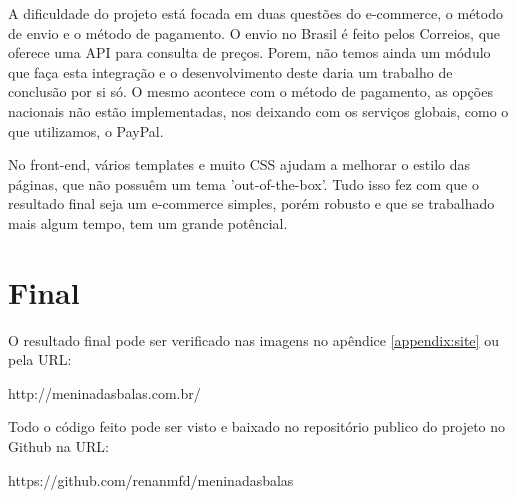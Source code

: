 A dificuldade do projeto está focada em duas questões do e-commerce, o método de envio e o método de pagamento. O envio no Brasil é feito pelos Correios, que oferece uma API para consulta de preços. Porem, não temos ainda um módulo que faça esta integração e o desenvolvimento deste daria um trabalho de conclusão por si só. O mesmo acontece com o método de pagamento, as opções nacionais não estão implementadas, nos deixando com os serviços globais, como o que utilizamos, o PayPal.

No front-end, vários templates e muito CSS ajudam a melhorar o estilo das páginas, que não possuêm um tema 'out-of-the-box'. Tudo isso fez com que o resultado final seja um e-commerce simples, porém robusto e que se trabalhado mais algum tempo, tem um grande potêncial.

\section{Final}

O resultado final pode ser verificado nas imagens no apêndice \ref{appendix:site} ou pela URL:

\begin{center}
  http://meninadasbalas.com.br/
\end{center}

Todo o código feito pode ser visto e baixado no repositório publico do projeto no Github na URL:

\begin{center}
  https://github.com/renanmfd/meninadasbalas
\end{center}

